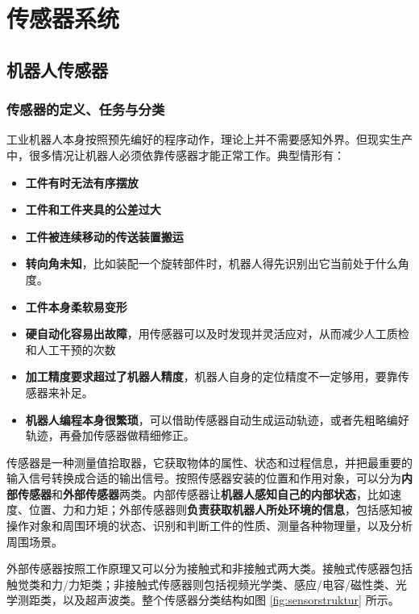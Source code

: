 \section{传感器系统}

\subsection{机器人传感器}

\subsubsection{传感器的定义、任务与分类}

工业机器人本身按照预先编好的程序动作，理论上并不需要感知外界。但现实生产中，很多情况让机器人必须依靠传感器才能正常工作。典型情形有：
\begin{itemize}
    \item \textbf{工件有时无法有序摆放}
    \item \textbf{工件和工件夹具的公差过大}
    \item \textbf{工件被连续移动的传送装置搬运}
    \item \textbf{转向角未知}，比如装配一个旋转部件时，机器人得先识别出它当前处于什么角度。
    \item \textbf{工件本身柔软易变形}
    \item \textbf{硬自动化容易出故障}，用传感器可以及时发现并灵活应对，从而减少人工质检和人工干预的次数
    \item \textbf{加工精度要求超过了机器人精度}，机器人自身的定位精度不一定够用，要靠传感器来补足。
    \item \textbf{机器人编程本身很繁琐}，可以借助传感器自动生成运动轨迹，或者先粗略编好轨迹，再叠加传感器做精细修正。
\end{itemize}

传感器是一种测量值拾取器，它获取物体的属性、状态和过程信息，并把最重要的输入信号转换成合适的输出信号。按照传感器安装的位置和作用对象，可以分为\textbf{内部传感器}和\textbf{外部传感器}两类。内部传感器让\textbf{机器人感知自己的内部状态}，比如速度、位置、力和力矩；外部传感器则\textbf{负责获取机器人所处环境的信息}，包括感知被操作对象和周围环境的状态、识别和判断工件的性质、测量各种物理量，以及分析周围场景。

外部传感器按照工作原理又可以分为接触式和非接触式两大类。接触式传感器包括触觉类和力/力矩类；非接触式传感器则包括视频光学类、感应/电容/磁性类、光学测距类，以及超声波类。整个传感器分类结构如图 \ref{fig:sensorstruktur} 所示。

